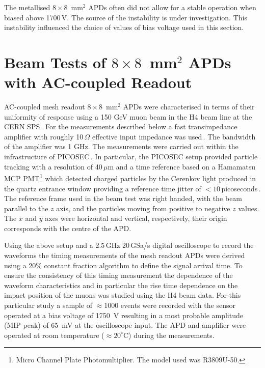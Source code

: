 \documentclass[3p,preprint,twocolumn]{elsarticle}
\begin{document}
The metallised $8 \times 8$~mm$^2$ APDs often did not allow for a stable operation when biased above 1700\,V.
The source of the instability is under investigation.
This instability influenced the choice of values of bias voltage used in this section.

\section{Beam Tests of $8 \times 8$~mm$^2$ APDs with AC-coupled Readout}
\label{sec:tb8x8}

AC-coupled mesh readout $8 \times 8$~mm$^2$ APDs were characterised in terms of their uniformity of response using a 150 GeV muon beam in the H4 beam line at the CERN SPS\,\cite{h4page}.
For the measurements described below a fast transimpedance amplifier with roughly 10\,$\Omega$ effective input impedance was used\,\cite{whiteACES2014}.
The bandwidth of the amplifier was 1 GHz.
The measurements were carried out within the infrastructure of PICOSEC\,\cite{bortfeld2018}.
In particular, the PICOSEC setup provided particle tracking with a resolution of 40\,$\mu$m and a time reference based on a Hamamatsu MCP PMT\footnote{Micro Channel Plate Photomultiplier. The model used was R3809U-50.} which detected charged particles by the Cerenkov light produced in the quartz entrance window providing a reference time jitter of $<10$\,picoseconds\,\cite{sohl2018}.
The reference frame used in the beam test was right handed, with the beam parallel to the $z$ axis, and the particles moving from positive to negative $z$ values.
The $x$ and $y$ axes were horizontal and vertical, respectively, their origin corresponds with the centre of the APD.

Using the above setup and a 2.5\,GHz 20\,GSa/s digital oscilloscope to record the waveforms the timing measurements of the mesh readout APDs were derived using a 20\% constant fraction algorithm to define the signal arrival time.
To ensure the consistency of this timing measurement the dependence of the waveform characteristics and in particular the rise time dependence on the impact position of the muons was studied using the H4 beam data.
For this particular study a sample of $\approx$1000 events were recorded with the sensor operated at a bias voltage of 1750~V resulting in a most probable amplitude (MIP peak) of 65~mV at the oscilloscope input.
The APD and amplifier were operated at room temperature ($\approx20^\circ$C) during the measurements.
\end{document}
